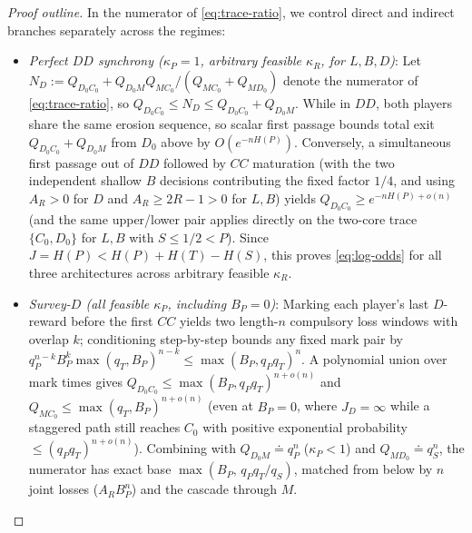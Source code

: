 \documentclass[11pt,reqno]{amsart}
\theoremstyle{definition}
\theoremstyle{remark}
\begin{document}
\begin{proof}[Proof outline]
In the numerator of \eqref{eq:trace-ratio}, we control direct and indirect branches separately across the regimes:
\begin{itemize}
  \item \emph{Perfect $DD$ synchrony ($\kappa_P = 1$, arbitrary feasible $\kappa_R$, for $L, B, D$)}: Let $N_D := Q_{D_0 C_0} + Q_{D_0 M} Q_{MC_0}/(Q_{MC_0}+Q_{MD_0})$ denote the numerator of \eqref{eq:trace-ratio}, so $Q_{D_0 C_0} \le N_D \le Q_{D_0 C_0} + Q_{D_0 M}$. While in $DD$, both players share the same erosion sequence, so scalar first passage bounds total exit $Q_{D_0 C_0} + Q_{D_0 M}$ from $D_0$ above by $O(e^{-n H(P)})$. Conversely, a simultaneous first passage out of $DD$ followed by $CC$ maturation (with the two independent shallow $B$ decisions contributing the fixed factor $1/4$, and using $A_R > 0$ for $D$ and $A_R \ge 2R-1 > 0$ for $L,B$) yields $Q_{D_0 C_0} \ge e^{-n H(P) + o(n)}$ (and the same upper/lower pair applies directly on the two-core trace $\{C_0, D_0\}$ for $L,B$ with $S \le 1/2 < P$). Since $J = H(P) < H(P) + H(T) - H(S)$, this proves \eqref{eq:log-odds} for all three architectures across arbitrary feasible $\kappa_R$.
  \item \emph{Survey-$D$ (all feasible $\kappa_P$, including $B_P = 0$)}: Marking each player's last $D$-reward before the first $CC$ yields two length-$n$ compulsory loss windows with overlap $k$; conditioning step-by-step bounds any fixed mark pair by $q_P^{n-k} B_P^k \max(q_T, B_P)^{n-k} \le \max(B_P, q_P q_T)^n$. A polynomial union over mark times gives $Q_{D_0 C_0} \le \max(B_P, q_P q_T)^{n+o(n)}$ and $Q_{M C_0} \le \max(q_T, B_P)^{n+o(n)}$ (even at $B_P = 0$, where $J_D = \infty$ while a staggered path still reaches $C_0$ with positive exponential probability $\le (q_P q_T)^{n+o(n)}$). Combining with $Q_{D_0 M} \doteq q_P^n$ ($\kappa_P < 1$) and $Q_{M D_0} \doteq q_S^n$, the numerator has exact base $\max(B_P,\, q_P q_T/q_S)$, matched from below by $n$ joint losses ($A_R B_P^n$) and the cascade through $M$.

\end{itemize}
\end{proof}
\end{document}
